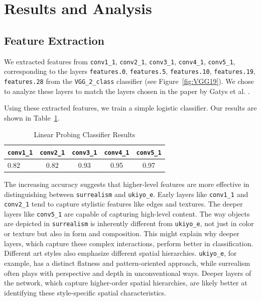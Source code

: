 \documentclass[twocolumn]{article}
\begin{document}

\section{Results and Analysis}
\subsection{Feature Extraction}
We extracted features from \verb|conv1_1|, \verb|conv2_1|, \verb|conv3_1|, \verb|conv4_1|, \verb|conv5_1|, corresponding to the layers \verb|features.0|, \verb|features.5|, \verb|features.10|, \verb|features.19|,  \verb|features.28| from the \verb|VGG_2_class| classifier (see Figure~\ref{fig:VGG19}). We chose to analyze these layers to match the layers chosen in the paper by Gatys et al. \cite{gatysNeuralAlgorithmArtistic2015}. 


Using these extracted features, we train a simple logistic classifier. Our results are shown in Table~\ref{tab:linear prob result}. 

\begin{table}[H]
  \centering
  \label{tab:example}
  \begin{tabular}{|l|c|c|c|c|}
    \hline
    \verb|conv1_1| & \verb|conv2_1| & \verb|conv3_1| & \verb|conv4_1| & \verb|conv5_1| \\
    \hline
    0.82 & 0.82 & 0.93 & 0.95 & 0.97 \\
    \hline
  \end{tabular}
  \caption{Linear Probing Classifier Results}
  \label{tab:linear prob result}
\end{table}

The increasing accuracy suggests that higher-level features are more effective in distinguishing between \verb|surrealism| and \verb|ukiyo_e|. Early layers like \verb|conv1_1| and \verb|conv2_1| tend to capture stylistic features like edges and textures. The deeper layers like \verb|conv5_1| are capable of capturing high-level content. The way objects are depicted in \verb|surrealism| is inherently different from \verb|ukiyo_e|, not just in color or texture but also in form and composition. This might explain why deeper layers, which capture these complex interactions, perform better in classification. Different art styles also emphasize different spatial hierarchies. \verb|ukiyo_e|, for example, has a distinct flatness and pattern-oriented approach, while surrealism often plays with perspective and depth in unconventional ways. Deeper layers of the network, which capture higher-order spatial hierarchies, are likely better at identifying these style-specific spatial characteristics.
\end{document}
